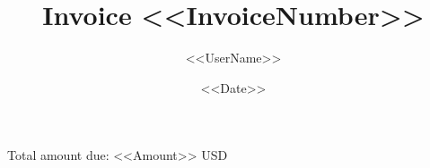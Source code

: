 \documentclass[12pt]{article}
\begin{document}
    \title{Invoice <<InvoiceNumber>>}
    \author{<<UserName>>}
    \date{<<Date>>}

    \maketitle

    Total amount due: <<Amount>> USD
\end{document}
